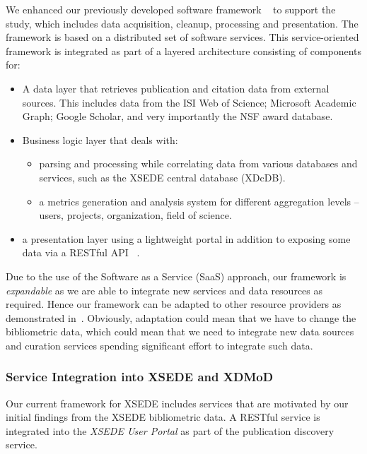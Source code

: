 \documentclass[sigconf]{acmart}
\begin{document}
We enhanced our previously developed software framework
~\cite{Wang:2014:TSI:2616498.2616507} to support the
study, which includes data acquisition, cleanup, processing and
presentation. The framework is based on a distributed set of software
services. This service-oriented framework is integrated as part of a
layered architecture consisting of components for:

\begin{itemize}
\item A data layer that retrieves publication and citation data from
  external sources. This includes data from the ISI Web of Science;
  Microsoft Academic Graph; Google Scholar, and very importantly the
  NSF award database.

\item Business logic layer that deals with:

  \begin{itemize}
  \item parsing and processing while correlating data from various
    databases and services, such as the XSEDE central database
    (XDcDB).
  \item a metrics generation and analysis system for different
    aggregation levels -- users, projects, organization, field of
    science.
  \end{itemize}

\item a presentation layer using a lightweight portal in addition to
  exposing some data via a RESTful API
  ~\cite{www-xdmod-sciimp}.
\end{itemize}

Due to the use of the Software as a Service (SaaS) approach, our
framework is \emph{expandable} as we are able to integrate new
services and data resources as required. Hence our framework can be
adapted to other resource providers as demonstrated
in~\cite{tas2015}. Obviously, adaptation could mean that we have to
change the bibliometric data, which could mean that we need to
integrate new data sources and curation services spending significant
effort to integrate such data.

\subsubsection{Service Integration into XSEDE and XDMoD}

Our current framework for XSEDE includes services that are motivated
by our initial findings from the XSEDE bibliometric data. A RESTful
service is integrated into the \emph{XSEDE User Portal} as part of the
publication discovery service.
\end{document}
